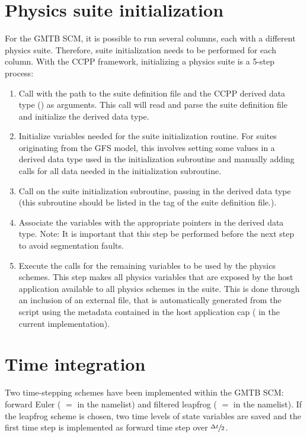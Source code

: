 \section{Physics suite initialization}
\label{section: physics init}
For the GMTB SCM, it is possible to run several columns, each with a different physics suite. Therefore, suite initialization needs to be performed for each column. With the CCPP framework, initializing a physics suite is a 5-step process:
\begin{enumerate}
\item Call  with the path to the suite definition file and the CCPP derived data type () as arguments. This call will read and parse the suite definition file and initialize the  derived data type.
\item Initialize variables needed for the suite initialization routine. For suites originating from the GFS model, this involves setting some values in a derived data type used in the initialization subroutine and manually adding  calls for all data needed in the initialization subroutine.
\item Call  on the suite initialization subroutine, passing in the  derived data type (this subroutine should be listed in the  tag of the suite definition file.).
\item Associate the  variables with the appropriate pointers in the  derived data type. Note: It is important that this step be performed before the next step to avoid segmentation faults.
\item Execute the  calls for the remaining variables to be used by the physics schemes. This step makes all physics variables that are exposed by the host application available to all physics schemes in the suite. This is done through an inclusion of an external file,  that is automatically generated from the  script using the metadata contained in the host application cap ( in the current implementation).
\end{enumerate}

\section{Time integration}
\label{section: time integration}
Two time-stepping schemes have been implemented within the GMTB SCM: forward Euler ( $=$  in the  namelist) and filtered leapfrog ( $=$  in the  namelist). If the leapfrog scheme is chosen, two time levels of state variables are saved and the first time step is implemented as forward time step over $\sfrac{\Delta t}{2}$.

